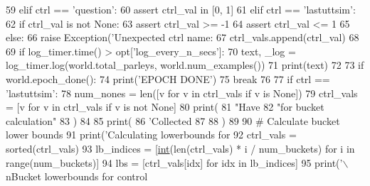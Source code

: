 \begin{DoxyCode}
{59         \textcolor{keywordflow}{elif} ctrl == \textcolor{stringliteral}{'question'}:
60             \textcolor{keyword}{assert} ctrl\_val \textcolor{keywordflow}{in} [0, 1]
61         \textcolor{keywordflow}{elif} ctrl == \textcolor{stringliteral}{'lastuttsim'}:
62             \textcolor{keywordflow}{if} ctrl\_val \textcolor{keywordflow}{is} \textcolor{keywordflow}{not} \textcolor{keywordtype}{None}:
63                 \textcolor{keyword}{assert} ctrl\_val >= -1
64                 \textcolor{keyword}{assert} ctrl\_val <= 1
65         \textcolor{keywordflow}{else}:
66             \textcolor{keywordflow}{raise} Exception(\textcolor{stringliteral}{'Unexpected ctrl name: %
67         ctrl\_vals.append(ctrl\_val)
68 
69         \textcolor{keywordflow}{if} log\_timer.time() > opt[\textcolor{stringliteral}{'log\_every\_n\_secs'}]:
70             text, \_log = log\_timer.log(world.total\_parleys, world.num\_examples())
71             print(text)
72 
73         \textcolor{keywordflow}{if} world.epoch\_done():
74             print(\textcolor{stringliteral}{'EPOCH DONE'})
75             \textcolor{keywordflow}{break}
76 
77     \textcolor{keywordflow}{if} ctrl == \textcolor{stringliteral}{'lastuttsim'}:
78         num\_nones = len([v \textcolor{keywordflow}{for} v \textcolor{keywordflow}{in} ctrl\_vals \textcolor{keywordflow}{if} v \textcolor{keywordflow}{is} \textcolor{keywordtype}{None}])
79         ctrl\_vals = [v \textcolor{keywordflow}{for} v \textcolor{keywordflow}{in} ctrl\_vals \textcolor{keywordflow}{if} v \textcolor{keywordflow}{is} \textcolor{keywordflow}{not} \textcolor{keywordtype}{None}]
80         print(
81             \textcolor{stringliteral}{"Have %
82             \textcolor{stringliteral}{"for bucket calculation"} %
83         )
84 
85     print(
86         \textcolor{stringliteral}{'Collected %
87         %
88     )
89 
90     \textcolor{comment}{# Calculate bucket lower bounds}
91     print(\textcolor{stringliteral}{'Calculating lowerbounds for %
92     ctrl\_vals = sorted(ctrl\_vals)
93     lb\_indices = [\hyperlink{namespacelanguage__model_1_1eval__ppl_a7d12ee00479673c5c8d1f6d01faa272a}{int}(len(ctrl\_vals) * i / num\_buckets) \textcolor{keywordflow}{for} i \textcolor{keywordflow}{in} range(num\_buckets)]
94     lbs = [ctrl\_vals[idx] \textcolor{keywordflow}{for} idx \textcolor{keywordflow}{in} lb\_indices]
95     print(\textcolor{stringliteral}{'\(\backslash\)nBucket lowerbounds for control %
}}}}}}
\end{DoxyCode}
